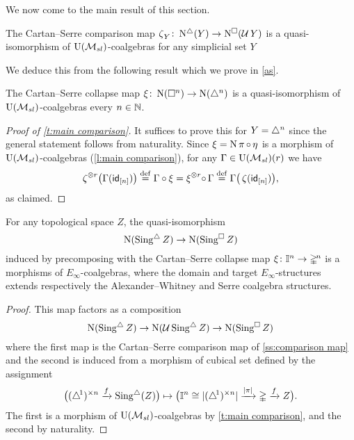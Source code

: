 We now come to the main result of this section.

\begin{theorem} \label{t:main comparison}
	The Cartan--Serre comparison map $\operatorname{\zeta}_Y \colon \operatorname{N^{\triangle}}(Y) \to \operatorname{N^{\square}}(\operatorname{\mathcal{U}} Y)$ is a quasi-isomorphism of ${\operatorname{U}(\mathcal{M}_{sl})}$-coalgebras for any simplicial set $Y$
\end{theorem}

We deduce this from the following result which we prove in \cref{as}.

\begin{lemma} \label{l:main comparison}
	The Cartan--Serre collapse map $\operatorname{\xi} \colon \operatorname{N}(\square^n) \to \operatorname{N}(\triangle^n)$ is a quasi-isomorphism of ${\operatorname{U}(\mathcal{M}_{sl})}$-coalgebras every $n \in \mathbb{N}$.
\end{lemma}

\begin{proof}[Proof of \cref{t:main comparison}]
	It suffices to prove this for $Y = \triangle^n$ since the general statement follows from naturality.
	Since $\operatorname{\xi} = \operatorname{N} \operatorname{\pi} \circ \operatorname{\eta}$ is a morphism of ${\operatorname{U}(\mathcal{M}_{sl})}$-coalgebras (\cref{l:main comparison}), for any $\Gamma \in {\operatorname{U}(\mathcal{M}_{sl})}(r)$ we have
	\begin{align*}
	\operatorname{\zeta}^{\otimes r} \! \big( \Gamma(\mathsf{id}_{[n]}) \big) \stackrel{\mathrm{def}}{=}
	\Gamma \circ \operatorname{\xi} =
	\operatorname{\xi}^{\otimes r} \! \circ \, \Gamma \stackrel{\mathrm{def}}{=}
	\Gamma \big( \operatorname{\zeta} (\mathsf{id}_{[n]}) \big),
	\end{align*}
	as claimed.
\end{proof}

\begin{corollary} \label{t:topological comparison}
	For any topological space $Z$, the quasi-isomorphism
	\[
	\operatorname{N}(\operatorname{Sing^{\triangle}} Z) \to \operatorname{N}(\operatorname{Sing^{\square}} Z)
	\]
	induced by precomposing with the Cartan--Serre collapse map $\operatorname{\xi} \colon \mathbb{I}^n \to \mathbb{\Delta}^{\!n}$ is a morphisms of $E_\infty$-coalgebras, where the domain and target $E_\infty$-structures extends respectively the Alexander--Whitney and Serre coalgebra structures.
\end{corollary}

\begin{proof}
	This map factors as a composition
	\[
	\operatorname{N}(\operatorname{Sing^{\triangle}} Z) \to \operatorname{N}(\operatorname{\mathcal{U}} \operatorname{Sing^{\triangle}} Z) \to \operatorname{N}(\operatorname{Sing^{\square}} Z)
	\]
	where the first map is the Cartan--Serre comparison map of \cref{ss:comparison map} and the second is induced from a morphism of cubical set defined by the assignment
	\[
	\big( (\triangle^{\!1})^{\times n} \xrightarrow{f} \operatorname{Sing^{\triangle}}(Z) \big) \mapsto
	\big( \mathbb{I}^n \cong \lvert(\triangle^{\!1})^{\times n}\rvert \xrightarrow{\lvert\operatorname{\pi}\rvert} \mathbb{\Delta} \xrightarrow{f} Z \big).
	\]
	The first is a morphism of ${\operatorname{U}(\mathcal{M}_{sl})}$-coalgebras by \cref{t:main comparison}, and the second by naturality.
\end{proof}



